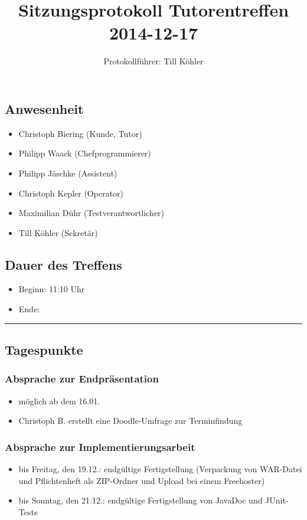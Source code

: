\documentclass[12pt,a4paper]{article}
\author{Protokollführer: Till Köhler}
\title{Sitzungsprotokoll Tutorentreffen 2014-12-17}
\date{}
\begin{document}
\maketitle

\subsection*{Anwesenheit}
\medskip
\begin{itemize}
\item Christoph Biering (Kunde, Tutor)
\item Philipp Waack (Chefprogrammierer)
\item Philipp Jäschke (Assistent)
\item Christoph Kepler (Operator)
\item Maximilian Dühr (Testverantwortlicher)
\item Till Köhler (Sekretär)
\end{itemize}

\subsection*{Dauer des Treffens}
\medskip
\begin{itemize}
\item Beginn: 11:10 Uhr
\item Ende:
\end{itemize}

\noindent\rule{\textwidth}{1pt}

\subsection*{Tagespunkte}
\medskip

\subsubsection*{Absprache zur Endpräsentation}
\begin{itemize}
\item möglich ab dem 16.01.
\item Christoph B. erstellt eine Doodle-Umfrage zur Terminfindung
\end{itemize}

\subsubsection*{Absprache zur Implementierungsarbeit}
\begin{itemize}
\item bis Freitag, den 19.12.: endgültige Fertigstellung (Verpackung von WAR-Datei und Pflichtenheft als ZIP-Ordner und Upload bei einem Freehoster)
\item bis Sonntag, den 21.12.: endgültige Fertigstellung von JavaDoc und JUnit-Tests
\end{itemize}
\end{document}
